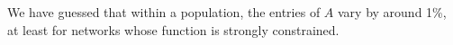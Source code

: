 \documentclass{article}
\newcommand{\1}{\mathbbm{1}}
\begin{document}
We have guessed that within a population, 
the entries of $A$ vary by around 1\%, 
at least for networks whose function is strongly constrained.




%
\end{document}
